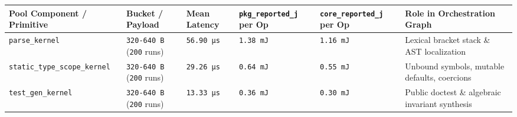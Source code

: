 \documentclass[10pt,letterpaper]{article}
\begin{document}
{\scriptsize\setlength{\tabcolsep}{3.0pt}\renewcommand{\arraystretch}{1.14}
\begin{longtable}[]{@{}
  >{\raggedright\arraybackslash}p{}
  >{\raggedright\arraybackslash}p{}
  >{\raggedleft\arraybackslash}p{}
  >{\raggedleft\arraybackslash}p{}
  >{\raggedleft\arraybackslash}p{}
  >{\raggedright\arraybackslash}p{}@{}}
\toprule\noalign{}
\begin{minipage}[b]{\linewidth}\raggedright
\textbf{Pool Component / Primitive}
\end{minipage} & \begin{minipage}[b]{\linewidth}\raggedright
\textbf{Bucket / Payload}
\end{minipage} & \begin{minipage}[b]{\linewidth}\raggedleft
\textbf{Mean Latency}
\end{minipage} & \begin{minipage}[b]{\linewidth}\raggedleft
\textbf{\texttt{pkg\_\allowbreak{}reported\_\allowbreak{}j} per Op}
\end{minipage} & \begin{minipage}[b]{\linewidth}\raggedleft
\textbf{\texttt{core\_\allowbreak{}reported\_\allowbreak{}j} per Op}
\end{minipage} & \begin{minipage}[b]{\linewidth}\raggedright
\textbf{Role in Orchestration Graph}
\end{minipage} \\
\midrule\noalign{}
\endhead
\bottomrule\noalign{}
\endlastfoot
\texttt{parse\_\allowbreak{}kernel} & \texttt{320-\allowbreak{}640\ B} (\texttt{200} runs) &
\texttt{56.90\ µs} & \texttt{1.38\ mJ} & \texttt{1.16\ mJ} & Lexical
bracket stack \& AST localization \\
\texttt{static\_\allowbreak{}type\_\allowbreak{}scope\_\allowbreak{}kernel} & \texttt{320-\allowbreak{}640\ B} (\texttt{200}
runs) & \texttt{29.26\ µs} & \texttt{0.64\ mJ} & \texttt{0.55\ mJ} &
Unbound symbols, mutable defaults, coercions \\
\texttt{test\_\allowbreak{}gen\_\allowbreak{}kernel} & \texttt{320-\allowbreak{}640\ B} (\texttt{200} runs) &
\texttt{13.33\ µs} & \texttt{0.36\ mJ} & \texttt{0.30\ mJ} & Public
doctest \& algebraic invariant synthesis \\

\end{longtable}}
\end{document}
